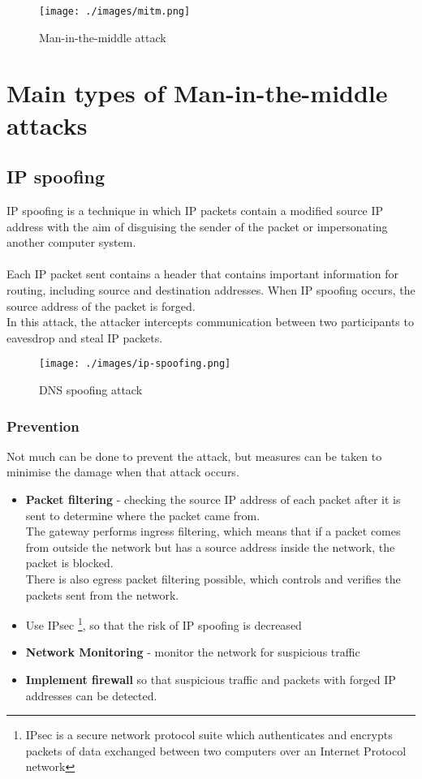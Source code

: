 \begin{figure}[H]
    \centering
    \texttt{[image: ./images/mitm.png]}
    \caption{Man-in-the-middle attack} 
\end{figure}

\newpage
\section{Main types of Man-in-the-middle attacks}
\subsection{IP spoofing}
IP spoofing is a technique in which IP packets contain a modified source IP address with the aim of disguising the sender of the packet or impersonating another computer system. \\
\\Each IP packet sent contains a header that contains important information for routing, including source and destination addresses. When IP spoofing occurs, the source address of the packet is forged. \\
In this attack, the attacker intercepts communication between two participants to eavesdrop and steal IP packets.
\begin{figure}[H]
    \centering
    \texttt{[image: ./images/ip-spoofing.png]}
    \caption{DNS spoofing attack} 
\end{figure}

\subsubsection{Prevention}
Not much can be done to prevent the attack, but measures can be taken to minimise the damage when that attack occurs.
\begin{itemize}
    \item \textbf{Packet filtering} - checking the source IP address of each packet after it is sent to determine where the packet came from. \\
    The gateway performs ingress filtering, which means that if a packet comes from outside the network but has a source address inside the network, the packet is blocked. \\
    There is also egress packet filtering possible, which controls and verifies the packets sent from the network.
    \item Use IPsec \footnote{IPsec is a secure network protocol suite which authenticates and encrypts packets of data exchanged between two computers over an Internet Protocol network}, so that the risk of IP spoofing is decreased
    \item \textbf{Network Monitoring} - monitor the network for suspicious traffic 
    \item \textbf{Implement firewall} so that suspicious traffic and packets with forged IP addresses can be detected.
\end{itemize}

